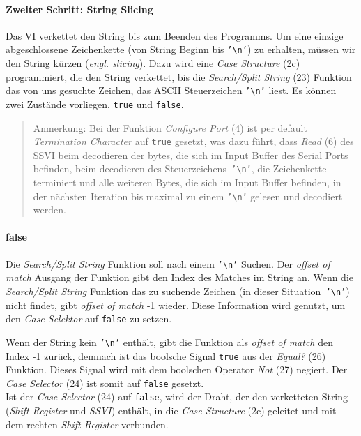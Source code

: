 \paragraph{Zweiter Schritt: \glqq String Slicing\grqq{}} Das VI verkettet den String bis zum Beenden des Programms. Um eine einzige abgeschlossene Zeichenkette (von String Beginn bis \texttt{'\textbackslash n'}) zu erhalten, müssen wir den String kürzen (\textit{engl. slicing}). Dazu wird eine \textit{Case Structure} (2c) programmiert, die den String verkettet, bis die \textit{Search/Split String} (23) Funktion das von uns gesuchte Zeichen, das ASCII Steuerzeichen \texttt{'\textbackslash n'} liest. Es können zwei Zustände vorliegen, \texttt{true} und \texttt{false}. 

\begin{quote}
Anmerkung: Bei der Funktion \textit{Configure Port} (4) ist per default \textit{Termination Character} auf \texttt{true} gesetzt, was dazu führt, dass \textit{Read} (6) des SSVI beim decodieren der bytes, die sich im Input Buffer des Serial Ports befinden, beim decodieren des Steuerzeichens\texttt{ '\textbackslash n'}, die Zeichenkette terminiert und alle weiteren Bytes, die sich im Input Buffer befinden, in der nächsten Iteration bis maximal zu einem \texttt{'\textbackslash n'} gelesen und decodiert werden.
\end{quote}


\paragraph*{false} Die \textit{Search/Split String} Funktion soll nach einem \texttt{'\textbackslash n'} Suchen. Der \textit{offset of match} Ausgang der Funktion gibt den Index des Matches im String an. Wenn die \textit{Search/Split String} Funktion das zu suchende Zeichen (in dieser Situation\texttt{ '\textbackslash n'}) nicht findet, gibt \textit{offset of match} -1 wieder. Diese Information wird genutzt, um den \textit{Case Selektor} auf \texttt{false} zu setzen. 

Wenn der String kein \texttt{'\textbackslash n'} enthält, gibt die Funktion als \textit{offset of match} den Index -1 zurück, demnach ist das boolsche Signal \texttt{true} aus der \textit{Equal?} (26) Funktion. Dieses Signal wird mit dem boolschen Operator \textit{Not} (27) negiert. Der \textit{Case Selector} (24) ist somit auf \texttt{false} gesetzt.\\
Ist der \textit{Case Selector} (24) auf \texttt{false}, wird der Draht, der den verketteten String (\textit{Shift Register} und \textit{SSVI}) enthält, in die \textit{Case Structure} (2c) geleitet und mit dem rechten \textit{Shift Register} verbunden.\newline

